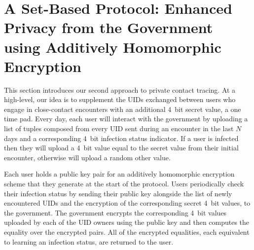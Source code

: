 \documentclass{article}
\begin{document}








\section{A Set-Based Protocol: Enhanced Privacy from the Government using Additively Homomorphic Encryption} \label{sec:she protocol}

This section introduces our second approach to private contact tracing. At a high-level, our idea is to supplement the UIDs exchanged between users who engage in close-contact encounters with an additional 4~bit secret value, a one time pad. Every day, each user will interact with the government by uploading a list of tuples composed from every UID sent during an encounter in the last $N$ days and a corresponding 4~bit infection status indicator. If a user is infected then they will upload a 4~bit value equal to the secret value from their initial encounter, otherwise will upload a random other value.

Each user holds a public key pair for an additively homomorphic encryption scheme that they generate at the start of the protocol. Users periodically check their infection status by sending their public key alongside the list of newly encountered UIDs and the encryption of the corresponding secret 4~bit values, to the government. The government encrypts the corresponding 4~bit values uploaded by each of the UID owners using the public key and then computes the equality over the encrypted pairs. All of the encrypted equalities, each equivalent to learning an infection status, are returned to the user. 
\end{document}

